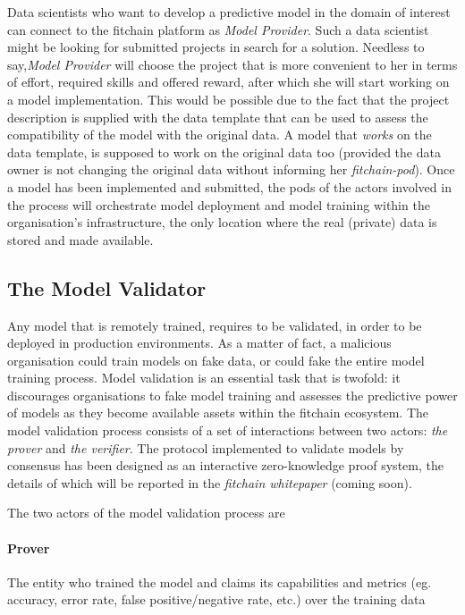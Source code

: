 \documentclass[12pt, a4paper,titlepage]{extreport}
\begin{document}
Data scientists who want to develop a predictive model in the domain of interest can connect to the fitchain platform as \emph{Model Provider}. Such a data scientist might be looking for submitted projects in search for a solution. Needless to say,\emph{Model Provider} will choose the project that is more convenient to her in terms of effort, required skills and offered reward, after which she will start working on a model implementation. This would be possible due to the fact that the project description is supplied with the data template that can be used to assess the compatibility of the model with the original data. A model that \textit{works} on the data template, is supposed to work on the original data too (provided the data owner is not changing the original data without informing her \textit{fitchain-pod}).
Once a model has been implemented and submitted, the pods of the actors involved in the process will orchestrate model deployment and model training within the organisation's infrastructure, the only location where the real (private) data is stored and made available. 

\subsection{The Model Validator}
Any model that is remotely trained, requires to be validated, in order to be deployed in production environments. As a matter of fact, a malicious organisation could train models on fake data, or could fake the entire model training process. 
Model validation is an essential task that is twofold: it discourages organisations to fake model training and assesses the predictive power of models as they become available assets within the fitchain ecosystem.
The model validation process consists of a set of interactions between two actors: \textit{the prover} and \textit{the verifier}. The protocol implemented to validate models by consensus has been designed as an interactive zero-knowledge\cite{zxsnarks} proof system, the details of which will be reported in the \textit{fitchain whitepaper} (coming soon).

The two actors of the model validation process are 

\paragraph{Prover}  The entity who trained the model and claims its capabilities and metrics (eg. accuracy, error rate, false positive/negative rate, etc.) over the training data
\end{document}
